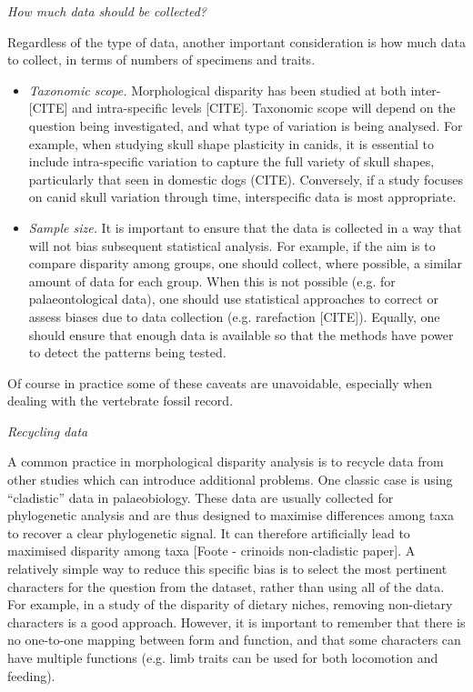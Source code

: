 \documentclass[12pt,letterpaper]{article}
\renewcommand{\subsection}[1]{%
\bigskip
\begin{center}
\begin{large}
\normalfont\itshape #1
\end{large}
\end{center}}
\begin{document}
\subsection{How much data should be collected?}
Regardless of the type of data, another important consideration is how much data to collect, in terms of numbers of specimens and traits.
\begin{itemize}
    \item \textit{Taxonomic scope.}
    Morphological disparity has been studied at both inter-[CITE] and intra-specific levels [CITE].
    Taxonomic scope will depend on the question being investigated, and what type of variation is being analysed.
    For example, when studying skull shape plasticity in canids, it is essential to include intra-specific variation to capture the full variety of skull shapes, particularly that seen in domestic dogs (CITE).
    Conversely, if a study focuses on canid skull variation through time, interspecific data is most appropriate.
    \item \textit{Sample size.}
    It is important to ensure that the data is collected in a way that will not bias subsequent statistical analysis.
    For example, if the aim is to compare disparity among groups, one should collect, where possible, a similar amount of data for each group.
    When this is not possible (e.g. for palaeontological data), one should use statistical approaches to correct or assess biases due to data collection (e.g. rarefaction [CITE]).
    Equally, one should ensure that enough data is available so that the methods have power to detect the patterns being tested.
    \end{itemize}

Of course in practice some of these caveats are unavoidable, especially when dealing with the vertebrate fossil record.

\subsection{Recycling data}
A common practice in morphological disparity analysis is to recycle data from other studies which can introduce additional problems.
One classic case is using ``cladistic'' data in palaeobiology.
These data are usually collected for phylogenetic analysis and are thus designed to maximise differences among taxa to recover a clear phylogenetic signal.
It can therefore artificially lead to maximised disparity among taxa [Foote - crinoids non-cladistic paper].
A relatively simple way to reduce this specific bias is to select the most pertinent characters for the question from the dataset, rather than using all of the data.
For example, in a study of the disparity of dietary niches, removing non-dietary characters is a good approach.
However, it is important to remember that there is no one-to-one mapping between form and function, and that some characters can have multiple functions (e.g. limb traits can be used for both locomotion and feeding).
\end{document}
